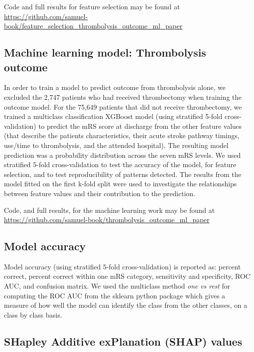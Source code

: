 Code and full results for feature selection may be found at \url{https://github.com/samuel-book/feature_selection_thrombolysis_outcome_ml_paper}

\subsection{Machine learning model: Thrombolysis outcome}

In order to train a model to predict outcome from thrombolysis alone, we excluded the 2,747 patients who had received thrombectomy when training the outcome model. For the 75,649 patients that did not receive thrombectomy, we trained a multiclass classification XGBoost model (using stratified 5-fold cross-validation) to predict the mRS score at discharge from the other feature values (that describe the patients characteristics, their acute stroke pathway timings, use/time to thrombolysis, and the attended hospital). The resulting model prediction was a probability distribution across the seven mRS levels. We used stratified 5-fold cross-validation to test the accuracy of the model, for feature selection, and to test reproducibility of patterns detected. The results from the model fitted on the first k-fold split were used to investigate the relationships between feature values and their contribution to the prediction.

Code, and full results, for the machine learning work may be found at \url{https://github.com/samuel-book/thrombolysis_outcome_ml_paper}

\subsection{Model accuracy}

Model accuracy (using stratified 5-fold cross-validation) is reported as: percent correct, percent correct within one mRS category, sensitivity and specificity, ROC AUC, and confusion matrix. We used the multiclass method \textit{one vs rest} \cite{fawcett_introduction_2006, hand_simple_2001} for computing the ROC AUC from the sklearn python package \cite{scikit-learn} which gives a measure of how well the model can identify the class from the other classes, on a class by class basis.

\subsection{SHapley Additive exPlanation (SHAP) values}

